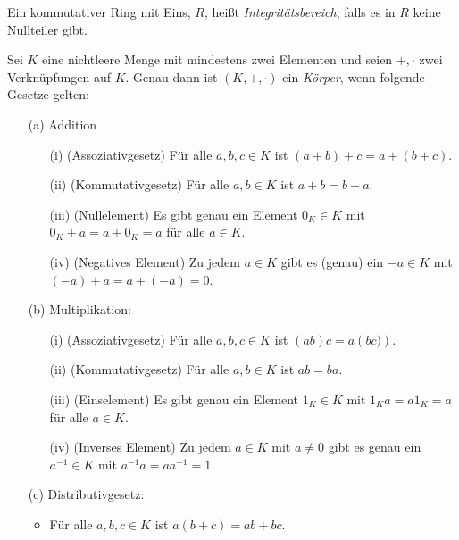 \begin{defn} \label{Integritätsbereich}
Ein kommutativer Ring mit Eins, $R$, heißt \textit{Integritätsbereich}, falls es in $R$ keine Nullteiler gibt.
\end{defn}
%
\begin{defn}
Sei $K$ eine nichtleere Menge mit mindestens zwei Elementen und seien $+, \cdot$ zwei Verknüpfungen auf $K$. Genau dann ist $\left(K, +, \cdot\right)$ ein \textit{Körper}, wenn folgende Gesetze gelten:
\begin{enumerate}
\item[(a)] Addition
\begin{enumerate}
\item[(i)] (Assoziativgesetz) Für alle $a, b, c \in K$ ist $\left(a + b \right) + c = a + \left(b +c\right)$.
\item[(ii)] (Kommutativgesetz) Für alle $a, b \in K$ ist $a+b = b + a$.
\item[(iii)] (Nullelement) Es gibt genau ein Element $0_K \in K$ mit $0_K + a = a + 0_K = a$ für alle $a \in K$.
\item[(iv)] (Negatives Element) Zu jedem $a \in K$ gibt es (genau) ein $-a \in K$ mit $\left(-a\right)+ a = a + \left(-a\right)= 0$.
\end{enumerate} 
\item[(b)] Multiplikation:
\begin{enumerate}
\item[(i)] (Assoziativgesetz) Für alle $a, b, c \in K$ ist $\left(ab\right)c = a\left(bc)\right)$.
\item[(ii)] (Kommutativgesetz) Für alle $a, b \in K$ ist $ab = ba$.
\item[(iii)] (Einselement) Es gibt genau ein Element $1_K \in K$ mit $1_K a = a 1_K = a$ für alle $a \in K$.
\item[(iv)] (Inverses Element) Zu jedem $a \in K$ mit $a\neq 0 $ gibt es genau ein $a^{-1} \in K$ mit $a^{-1} a = a a^{-1} = 1$.
\end{enumerate}
\item[(c)] Distributivgesetz:
\begin{itemize}
\item Für alle $a, b, c \in K$ ist $a\left(b +c\right) = ab + bc$.
\end{itemize}
\end{enumerate}
\end{defn}



